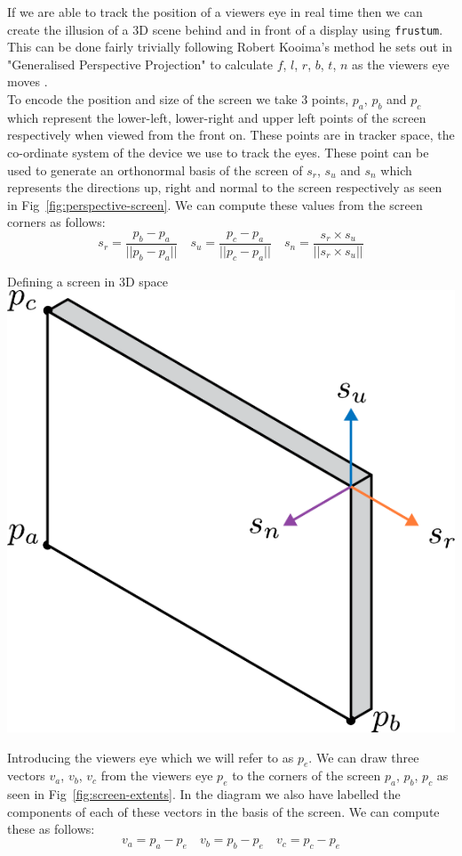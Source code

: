 If we are able to track the position of a viewers eye in real time then we can create the illusion of a 3D scene behind and in front of a display using \texttt{frustum}. This can be done fairly trivially following Robert Kooima's method he sets out in "Generalised Perspective Projection" to calculate $f$, $l$, $r$, $b$, $t$, $n$ as the viewers eye moves \cite{kooima2009generalized}. \\



To encode the position and size of the screen we take 3 points, $p_a$, $p_b$ and $p_c$ which represent the lower-left, lower-right and upper left points of the screen respectively when viewed from the front on. These points are in tracker space, the co-ordinate system of the device we use to track the eyes. These point can be used to generate an orthonormal basis of the screen of $s_r$, $s_u$ and $s_n$ which represents the directions up, right and normal to the screen respectively as seen in Fig~\ref{fig:perspective-screen}. We can compute these values from the screen corners as follows:
\[s_r = \frac{p_b-p_a}{||p_b-p_a||} \quad s_u = \frac{p_c-p_a}{||p_c-p_a||} \quad s_n = \frac{s_r\times s_u}{||s_r \times s_u||}\]

\begin{figureBox}[label={fig:perspective-screen}, width=0.8\linewidth]{Defining a screen in 3D space}
    \includegraphics[width = 0.3\linewidth]{./background/figures/projection/screen.pdf}
\end{figureBox}

Introducing the viewers eye which we will refer to as $p_e$. We can draw three vectors $v_a$, $v_b$, $v_c$ from the viewers eye $p_e$ to the corners of the screen $p_a$, $p_b$, $p_c$ as seen in Fig~\ref{fig:screen-extents}. In the diagram we also have labelled the components of each of these vectors in the basis of the screen. We can compute these as follows:
\[ v_a = p_a - p_e \quad v_b = p_b - p_e \quad v_c = p_c - p_e\] \\

